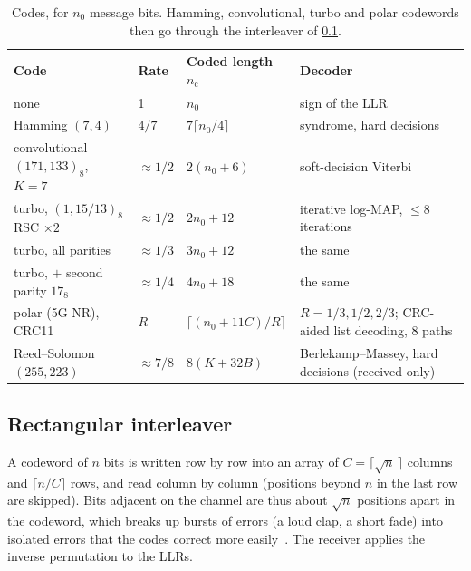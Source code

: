 \documentclass[11pt,a4paper]{article}
\newcommand{\nc}{n_{\mathrm{c}}}
\newcommand{\nz}{n_{0}}
\theoremstyle{remark}
\begin{document}
\begin{table}[ht]
\centering
\caption{Codes, for $\nz$ message bits. Hamming, convolutional, turbo and polar codewords then go through the interleaver of \cref{sec:ilv}.}
\label{tab:codes}
\begin{tabularx}{\linewidth}{lllX}
\toprule
Code & Rate & Coded length $\nc$ & Decoder\\
\midrule
none & 1 & $\nz$ & sign of the LLR\\
Hamming $(7,4)$ & $4/7$ & $7\lceil \nz/4 \rceil$ & syndrome, hard decisions\\
convolutional $(171,133)_8$, $K=7$ & $\approx 1/2$ & $2(\nz + 6)$ & soft-decision Viterbi\\
turbo, $(1, 15/13)_8$ RSC $\times 2$ & $\approx 1/2$ & $2\nz + 12$ & iterative log-MAP, $\le 8$ iterations\\
turbo, all parities & $\approx 1/3$ & $3\nz + 12$ & the same\\
turbo, $+$ second parity $17_8$ & $\approx 1/4$ & $4\nz + 18$ & the same\\
polar (5G NR), CRC11 & $R$ & $\lceil (\nz + 11C)/R \rceil$ & $R = 1/3, 1/2, 2/3$; CRC-aided list decoding, 8 paths\\
Reed--Solomon $(255,223)$ & $\approx 7/8$ & $8(K + 32B)$ & Berlekamp--Massey, hard decisions (received only)\\
\bottomrule
\end{tabularx}
\end{table}

\subsection{Rectangular interleaver}
\label{sec:ilv}
A codeword of $n$ bits is written row by row into an array of $C = \lceil \sqrt{n}\, \rceil$ columns and $\lceil n/C \rceil$ rows, and read column by column (positions beyond $n$ in the last row are skipped). Bits adjacent on the channel are thus about $\sqrt n$ positions apart in the codeword, which breaks up bursts of errors (a loud clap, a short fade) into isolated errors that the codes correct more easily~\cite{proakis,lincostello}. The receiver applies the inverse permutation to the LLRs.
\end{document}
